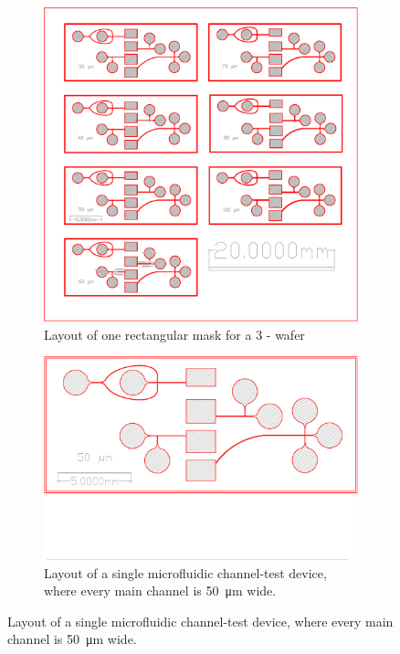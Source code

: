 \begin{figure}[h!]
\begin{subfigure}[c]{\textwidth}
		\centering
		\includegraphics[clip,trim={0mm 0mm 0mm 0mm},scale=.4]{Ressourcen/IMG/Microfluidics_Prototype_3_2018412-Layout_eval_compl}
		\caption{Layout of one rectangular mask for a \SI{3}{\inch} - wafer}
		\label{fig:CAD:mask:single}
	\end{subfigure}
	
	\vfill
	\begin{subfigure}[c]{\textwidth}
		\centering
		\includegraphics[clip,trim={0mm 50mm 0mm 0mm},scale=.55]{Ressourcen/IMG/Microfluidics_Prototype_3_2018412-Layout_Eval_50um}
		\caption{Layout of a single microfluidic channel-test device, where every main channel is \SI{50}{\micro\meter} wide.}
		\label{fig:CAD:mask:test}
	\end{subfigure}
	

\end{figure}
